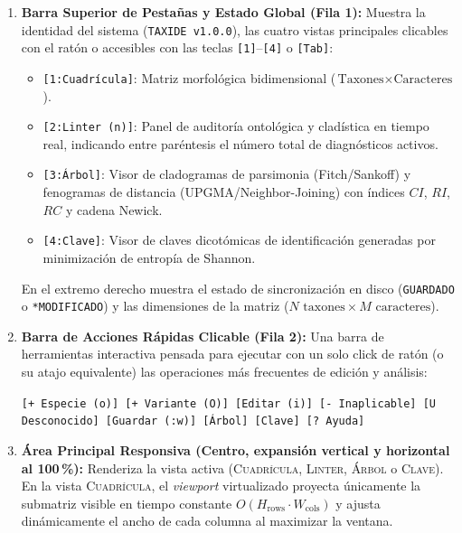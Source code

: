 \documentclass[11pt,a4paper]{article}
\newcommand{\keystroke}[1]{\texttt{[#1]}}
\begin{document}
\begin{enumerate}
    \item \textbf{Barra Superior de Pestañas y Estado Global (Fila 1):}
    Muestra la identidad del sistema (\texttt{TAXIDE v1.0.0}), las cuatro vistas principales clicables con el ratón o accesibles con las teclas \keystroke{1}--\keystroke{4} o \keystroke{Tab}:
    \begin{itemize}
        \item \keystroke{1:Cuadrícula}: Matriz morfológica bidimensional ($\text{Taxones} \times \text{Caracteres}$).
        \item \keystroke{2:Linter (n)}: Panel de auditoría ontológica y cladística en tiempo real, indicando entre paréntesis el número total de diagnósticos activos.
        \item \keystroke{3:Árbol}: Visor de cladogramas de parsimonia (Fitch/Sankoff) y fenogramas de distancia (UPGMA/Neighbor-Joining) con índices $CI$, $RI$, $RC$ y cadena Newick.
        \item \keystroke{4:Clave}: Visor de claves dicotómicas de identificación generadas por minimización de entropía de Shannon.
    \end{itemize}
    En el extremo derecho muestra el estado de sincronización en disco (\texttt{GUARDADO} o \texttt{*MODIFICADO}) y las dimensiones de la matriz ($N\text{ taxones} \times M\text{ caracteres}$).

    \item \textbf{Barra de Acciones Rápidas Clicable (Fila 2):}
    Una barra de herramientas interactiva pensada para ejecutar con un solo click de ratón (o su atajo equivalente) las operaciones más frecuentes de edición y análisis:
    \begin{center}
    \small
    \texttt{[+ Especie (o)] [+ Variante (O)] [Editar (i)] [- Inaplicable] [U Desconocido] [Guardar (:w)] [Árbol] [Clave] [? Ayuda]}
    \end{center}

    \item \textbf{Área Principal Responsiva (Centro, expansión vertical y horizontal al 100\,\%):}
    Renderiza la vista activa (\textsc{Cuadrícula}, \textsc{Linter}, \textsc{Árbol} o \textsc{Clave}). En la vista \textsc{Cuadrícula}, el \textit{viewport} virtualizado proyecta únicamente la submatriz visible en tiempo constante $O(H_{\text{rows}} \cdot W_{\text{cols}})$ y ajusta dinámicamente el ancho de cada columna al maximizar la ventana.


\end{enumerate}
\end{document}
